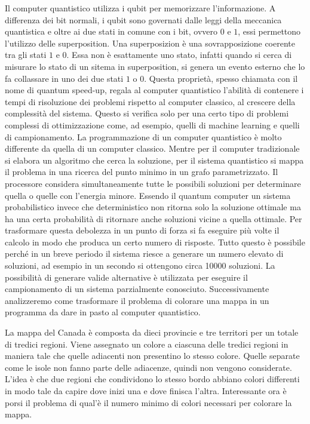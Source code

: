 Il computer quantistico utilizza i qubit per memorizzare l'informazione. A differenza dei bit normali, i qubit sono governati dalle leggi della meccanica quantistica e oltre ai due stati in comune con i bit, ovvero $0$ e $1$, essi permettono l'utilizzo delle superposition. Una superposizion è una sovrapposizione coerente tra gli stati $1$ e $0$. Essa non è esattamente uno stato, infatti quando si cerca di misurare lo stato di un sitema in superposition, si genera un evento esterno che lo fa collassare in uno dei due stati $1$ o $0$. Questa proprietà, spesso chiamata con il nome di quantum speed-up, regala al computer quantistico l'abilità di contenere i tempi di risoluzione dei problemi rispetto al computer classico, al crescere della complessità del sistema. Questo si verifica solo per una certo tipo di problemi complessi di ottimizzazione come, ad esempio, quelli di machine learning e quelli di campionamento. La programmazione di un computer quantistico è molto differente da quella di un computer classico. Mentre per il computer tradizionale si elabora un algoritmo che cerca la soluzione, per il sistema quantistico si mappa il problema in una ricerca del punto minimo in un grafo parametrizzato. Il processore considera simultaneamente tutte le possibili soluzioni per determinare quella o quelle con l'energia minore. Essendo il quantum computer un sistema probabilistico invece che deterministico non ritorna solo la soluzione ottimale ma ha una certa probabilità di ritornare anche soluzioni vicine a quella ottimale. Per trasformare questa debolezza in un punto di forza si fa eseguire più volte il calcolo in modo che produca un certo numero di risposte. Tutto questo è possibile perché in un breve periodo il sistema riesce a generare un numero elevato di soluzioni, ad esempio in un secondo si ottengono circa 10000 soluzioni. La possibilità di generare valide alternative è utilizzata per eseguire il campionamento di un sistema parzialmente conosciuto. Successivamente analizzeremo come trasformare il problema di colorare una mappa in un programma da dare in pasto al computer quantistico.

La mappa del Canada è composta da dieci provincie e tre territori per un totale di tredici regioni. Viene assegnato un colore a ciascuna delle tredici regioni in maniera tale che quelle adiacenti non presentino lo stesso colore. Quelle separate come le isole non fanno parte delle adiacenze, quindi non vengono considerate. L'idea è che due regioni che condividono lo stesso bordo abbiano colori differenti in modo tale da capire dove inizi una e dove finisca l'altra. Interessante ora è porsi il problema di qual'è il numero minimo di colori necessari per colorare la mappa.

